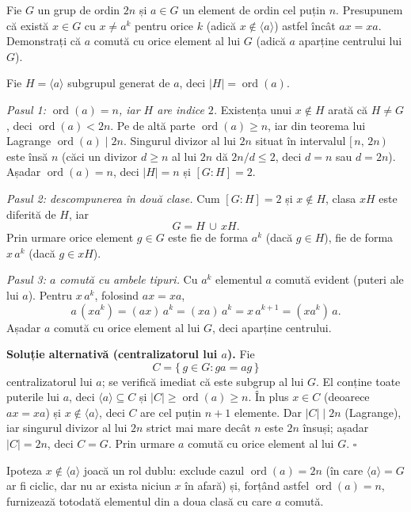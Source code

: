 \begin{problema}
Fie $G$ un grup de ordin $2n$ și $a \in G$ un element de ordin cel
puțin $n$. Presupunem că există $x \in G$ cu $x \neq a^{k}$
pentru orice $k$ (adică $x \notin \langle a\rangle$) astfel încât
$ax=xa$. Demonstrați că $a$ comută cu orice element al lui $G$
(adică $a$ aparține centrului lui $G$).
\end{problema}

\begin{solutie}
Fie $H=\langle a\rangle$ subgrupul generat de $a$, deci $|H|=\operatorname{ord}(a)$.

\smallskip
\textit{Pasul 1: $\operatorname{ord}(a)=n$, iar $H$ are indice $2$.}
Existența unui $x \notin H$ arată că $H \neq G$, deci
$\operatorname{ord}(a) < 2n$. Pe de altă parte $\operatorname{ord}(a) \geq n$,
iar din teorema lui Lagrange $\operatorname{ord}(a) \mid 2n$. Singurul
divizor al lui $2n$ situat în intervalul $[\,n,\,2n\,)$ este însă
$n$ (căci un divizor $d \geq n$ al lui $2n$ dă $2n/d \leq 2$, deci
$d=n$ sau $d=2n$). Așadar $\operatorname{ord}(a)=n$, deci $|H|=n$ și
$[G:H]=2$.

\smallskip
\textit{Pasul 2: descompunerea în două clase.} Cum $[G:H]=2$ și
$x \notin H$, clasa $xH$ este diferită de $H$, iar
\[
  G = H \,\cup\, xH .
\]
Prin urmare orice element $g \in G$ este fie de forma $a^{k}$ (dacă
$g \in H$), fie de forma $x\,a^{k}$ (dacă $g \in xH$).

\smallskip
\textit{Pasul 3: $a$ comută cu ambele tipuri.} Cu $a^{k}$ elementul $a$
comută evident (puteri ale lui $a$). Pentru $x\,a^{k}$, folosind
$ax=xa$,
\[
  a\,(x a^{k}) = (ax)\,a^{k} = (xa)\,a^{k} = x\,a^{k+1} = (x a^{k})\,a .
\]
Așadar $a$ comută cu orice element al lui $G$, deci aparține
centrului.
\end{solutie}

\medskip
\noindent\textbf{Soluție alternativă (centralizatorul lui $a$).}\enspace
Fie
\[
  C = \{\, g \in G : ga=ag \,\}
\]
centralizatorul lui $a$; se verifică imediat că este subgrup al lui
$G$. El conține toate puterile lui $a$, deci $\langle a\rangle \subseteq C$
și $|C| \geq \operatorname{ord}(a) \geq n$. În plus $x \in C$
(deoarece $ax=xa$) și $x \notin \langle a\rangle$, deci $C$ are cel
puțin $n+1$ elemente. Dar $|C| \mid 2n$ (Lagrange), iar singurul divizor
al lui $2n$ strict mai mare decât $n$ este $2n$ însuși; așadar
$|C|=2n$, deci $C=G$. Prin urmare $a$ comută cu orice element al lui $G$.
\hfill$\square$

\begin{obs}
Ipoteza $x \notin \langle a\rangle$ joacă un rol dublu: exclude cazul
$\operatorname{ord}(a)=2n$ (în care $\langle a\rangle=G$ ar fi ciclic,
dar nu ar exista niciun $x$ în afară) și, forțând astfel
$\operatorname{ord}(a)=n$, furnizează totodată elementul din a doua
clasă cu care $a$ comută.
\end{obs}

